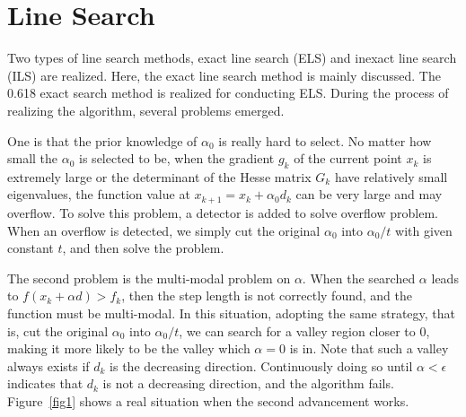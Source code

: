 \documentclass{article}
\begin{document}
\section{Line Search}
Two types of line search methods, exact line search (ELS) and inexact line search (ILS) are realized. Here, the exact line search method is mainly discussed. The 0.618 exact search method is realized for conducting ELS. During the process of realizing the algorithm, several problems emerged.

One is that the prior knowledge of $\alpha_0$ is really hard to select. No matter how small the $\alpha_0$ is selected to be, when the gradient $g_k$ of the current point $x_k$ is extremely large or the determinant of the Hesse matrix $G_k$ have relatively small eigenvalues, the function value at $x_{k+1}=x_k+\alpha_0d_k$ can be very large and may overflow. To solve this problem, a detector is added to solve overflow problem. When an overflow is detected, we simply cut the original $\alpha_0$ into $\alpha_0/t$ with given constant $t$, and then solve the problem.

The second problem is the multi-modal problem on $\alpha$. When the searched $\alpha$ leads to $f(x_k+\alpha d)>f_k$, then the step length is not correctly found, and the function must be multi-modal. In this situation, adopting the same strategy, that is, cut the original $\alpha_0$ into $\alpha_0/t$, we can search for a valley region closer to 0, making it more likely to be the valley which $\alpha=0$ is in. Note that such a valley always exists if $d_k$ is the decreasing direction. Continuously doing so until $\alpha<\epsilon$ indicates that $d_k$ is not a decreasing direction, and the algorithm fails. Figure~\ref{fig1} shows a real situation when the second advancement works.
\end{document}
